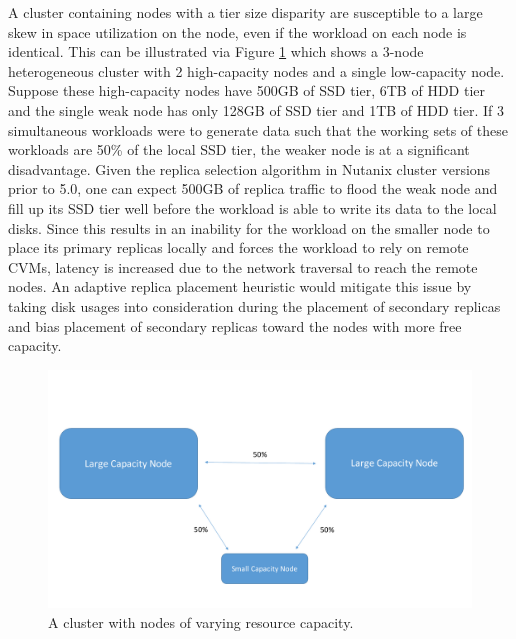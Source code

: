 \documentclass[12pt]{article}
\begin{document}
    A cluster containing nodes with a tier size disparity are susceptible to a
    large skew in space utilization on the node, even if the workload on each
    node is identical. This can be illustrated via Figure
    \ref{fig:tier_size_disparity} which shows a 3-node heterogeneous cluster
    with 2 high-capacity nodes and a single low-capacity node.  Suppose these
    high-capacity nodes have 500GB of SSD tier, 6TB of HDD tier and the single
    weak node has only 128GB of SSD tier and 1TB of HDD tier. If 3 simultaneous
    workloads were to generate data such that the working sets of these
    workloads are 50\% of the local SSD tier, the weaker node is at a
    significant disadvantage. Given the replica selection algorithm in Nutanix
    cluster versions prior to 5.0, one can expect 500GB of replica traffic to
    flood the weak node and fill up its SSD tier well before the workload is
    able to write its data to the local disks.  Since this results in an
    inability for the workload on the smaller node to place its primary
    replicas locally and forces the workload to rely on remote CVMs, latency is
    increased due to the network traversal to reach the remote nodes. An
    adaptive replica placement heuristic would mitigate this issue by taking
    disk usages into consideration during the placement of secondary replicas
    and bias placement of secondary replicas toward the nodes with more free
    capacity.

    \begin{figure}[htbp]
      \centering
      \includegraphics[scale=0.45]{images/homogeneous_tier_disparity.pdf} 
      \caption{A cluster with nodes of varying resource capacity.}
      \label{fig:tier_size_disparity}
    \end{figure}
\FloatBarrier

\newpage
\end{document}
